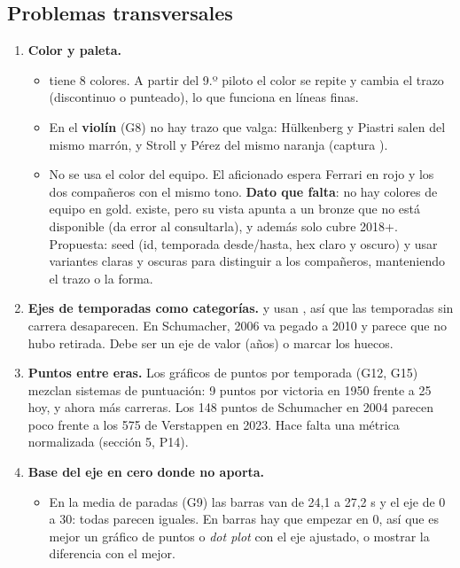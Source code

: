 \subsection{Problemas transversales}

\begin{enumerate}
\item \textbf{Color y paleta.}
\begin{itemize}
\item {} tiene 8 colores. A partir del 9.º piloto el color se repite y cambia el trazo (discontinuo o punteado), lo que funciona en líneas finas.
\item En el \textbf{violín} (G8) no hay trazo que valga: Hülkenberg y Piastri salen del mismo marrón, y Stroll y Pérez del mismo naranja (captura ).
\item No se usa el color del equipo. El aficionado espera Ferrari en rojo y los dos compañeros con el mismo tono. \textbf{Dato que falta}: no hay colores de equipo en gold.  existe, pero su vista apunta a un bronze que no está disponible (da error al consultarla), y además solo cubre 2018+. Propuesta: seed  (id, temporada desde/hasta, hex claro y oscuro) y usar variantes claras y oscuras para distinguir a los compañeros, manteniendo el trazo o la forma.
\end{itemize}
\item \textbf{Ejes de temporadas como categorías.}  y  usan , así que las temporadas sin carrera desaparecen. En Schumacher, 2006 va pegado a 2010 y parece que no hubo retirada. Debe ser un eje de valor (años) o marcar los huecos.
\item \textbf{Puntos entre eras.} Los gráficos de puntos por temporada (G12, G15) mezclan sistemas de puntuación: 9 puntos por victoria en 1950 frente a 25 hoy, y ahora más carreras. Los 148 puntos de Schumacher en 2004 parecen poco frente a los 575 de Verstappen en 2023. Hace falta una métrica normalizada (sección 5, P14).
\item \textbf{Base del eje en cero donde no aporta.}
\begin{itemize}
\item En la media de paradas (G9) las barras van de 24,1 a 27,2 s y el eje de 0 a 30: todas parecen iguales. En barras hay que empezar en 0, así que es mejor un gráfico de puntos o \emph{dot plot} con el eje ajustado, o mostrar la diferencia con el mejor.

\end{itemize}
\end{enumerate}
